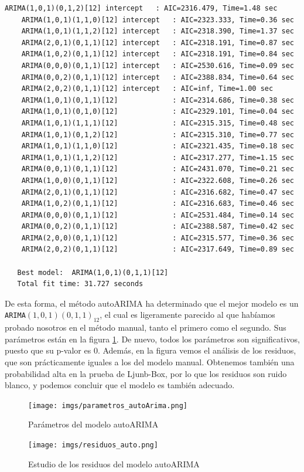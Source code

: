 \documentclass[a4paper,onecolumn]{extarticle}
\begin{document}
\begin{sloppypar}
\begin{lstlisting}[numbers=none]
    ARIMA(1,0,1)(0,1,2)[12] intercept   : AIC=2316.479, Time=1.48 sec
    ARIMA(1,0,1)(1,1,0)[12] intercept   : AIC=2323.333, Time=0.36 sec
    ARIMA(1,0,1)(1,1,2)[12] intercept   : AIC=2318.390, Time=1.37 sec
    ARIMA(2,0,1)(0,1,1)[12] intercept   : AIC=2318.191, Time=0.87 sec
    ARIMA(1,0,2)(0,1,1)[12] intercept   : AIC=2318.191, Time=0.84 sec
    ARIMA(0,0,0)(0,1,1)[12] intercept   : AIC=2530.616, Time=0.09 sec
    ARIMA(0,0,2)(0,1,1)[12] intercept   : AIC=2388.834, Time=0.64 sec
    ARIMA(2,0,2)(0,1,1)[12] intercept   : AIC=inf, Time=1.00 sec
    ARIMA(1,0,1)(0,1,1)[12]             : AIC=2314.686, Time=0.38 sec
    ARIMA(1,0,1)(0,1,0)[12]             : AIC=2329.101, Time=0.04 sec
    ARIMA(1,0,1)(1,1,1)[12]             : AIC=2315.315, Time=0.48 sec
    ARIMA(1,0,1)(0,1,2)[12]             : AIC=2315.310, Time=0.77 sec
    ARIMA(1,0,1)(1,1,0)[12]             : AIC=2321.435, Time=0.18 sec
    ARIMA(1,0,1)(1,1,2)[12]             : AIC=2317.277, Time=1.15 sec
    ARIMA(0,0,1)(0,1,1)[12]             : AIC=2431.070, Time=0.21 sec
    ARIMA(1,0,0)(0,1,1)[12]             : AIC=2322.608, Time=0.26 sec
    ARIMA(2,0,1)(0,1,1)[12]             : AIC=2316.682, Time=0.47 sec
    ARIMA(1,0,2)(0,1,1)[12]             : AIC=2316.683, Time=0.46 sec
    ARIMA(0,0,0)(0,1,1)[12]             : AIC=2531.484, Time=0.14 sec
    ARIMA(0,0,2)(0,1,1)[12]             : AIC=2388.587, Time=0.42 sec
    ARIMA(2,0,0)(0,1,1)[12]             : AIC=2315.577, Time=0.36 sec
    ARIMA(2,0,2)(0,1,1)[12]             : AIC=2317.649, Time=0.89 sec
   
   Best model:  ARIMA(1,0,1)(0,1,1)[12]          
   Total fit time: 31.727 seconds
\end{lstlisting}
De esta forma, el método autoARIMA ha determinado que el mejor modelo es un \texttt{ARIMA$(1,0,1)(0,1,1)_{12}$}, el cual es ligeramente parecido al que habíamos 
probado nosotros en el método manual, tanto el primero como el segundo. Sus parámetros están en la figura \ref{fig:parametros_autoArima}. De nuevo, todos los 
parámetros son significativos, puesto que su p-valor es 0. Además, en la figura \label{fig:residuos_auto} vemos el análisis de los residuos, que son prácticamente 
iguales a los del modelo manual. Obtenemos también una probabilidad alta en la prueba de Ljunb-Box, por lo que los residuos son ruido blanco, y podemos concluir 
que el modelo es también adecuado.
\begin{center}
    \begin{figure}[h!]
        \centering
        \texttt{[image: imgs/parametros\_autoArima.png]}
        \caption{Parámetros del modelo autoARIMA} \label{fig:parametros_autoArima}
    \end{figure}
\end{center}
\begin{center}
    \begin{figure}[h!]
        \centering
        \texttt{[image: imgs/residuos\_auto.png]}
        \caption{Estudio de los residuos del modelo autoARIMA} \label{fig:residuos_auto}
    \end{figure}
\end{center}


\end{sloppypar}
\end{document}

